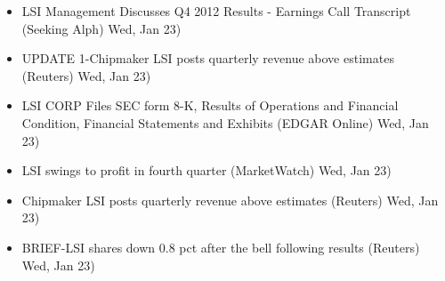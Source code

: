 \documentclass[11pt,asymmetric]{article}
\begin{document}
\begin{itemize}
\item LSI Management Discusses Q4 2012 Results - Earnings Call Transcript (Seeking Alph) Wed, Jan 23)
\item UPDATE 1-Chipmaker LSI posts quarterly revenue above estimates (Reuters) Wed, Jan 23)
\item LSI CORP Files SEC form 8-K, Results of Operations and Financial Condition, Financial Statements and Exhibits (EDGAR Online) Wed, Jan 23)
\item LSI swings to profit in fourth quarter (MarketWatch) Wed, Jan 23)
\item Chipmaker LSI posts quarterly revenue above estimates (Reuters) Wed, Jan 23)
\item BRIEF-LSI shares down 0.8 pct after the bell following results (Reuters) Wed, Jan 23)
\end{itemize}
\end{document}
